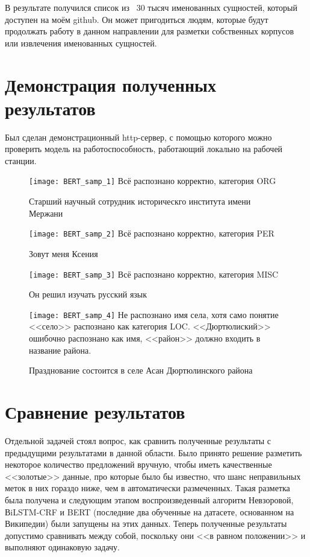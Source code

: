 В результате получился список из ~30 тысяч именованных сущностей, который доступен на моём github. %
Он может пригодиться людям, которые будут продолжать работу в данном направлении для разметки собственных корпусов или извлечения именованных сущностей. 

\section{Демонстрация полученных результатов}

Был сделан демонстрационный http-сервер, с помощью которого можно проверить модель на работоспособность, работающий локально на рабочей станции.


\begin{figure}[H]
\caption{Старший научный сотрудник историческго института имени Мержани}
\texttt{[image: BERT\_samp\_1]}
Всё распознано корректно, категория ORG
\label{fig:BERT_samp_1}
\end{figure}
\begin{figure}[H]
\caption{Зовут меня Ксения}
\texttt{[image: BERT\_samp\_2]}
Всё распознано корректно, категория PER
\label{fig:BERT_samp_2}
\end{figure}
\begin{figure}[H]
\caption{Он решил изучать русский язык}
\texttt{[image: BERT\_samp\_3]}
Всё распознано корректно, категория MISC
\label{fig:BERT_samp_3}
\end{figure}
\begin{figure}[H]
\caption{Празднование состоится в селе Асан Дюртюлинского района}
\texttt{[image: BERT\_samp\_4]}
Не распознано имя села, хотя само понятие <<село>> распознано как категория LOC. <<Дюртюлиский>> ошибочно распознано как имя, <<район>> должно входить в название района.
\label{fig:BERT_samp_4}
\end{figure}



\section{Сравнение результатов}

Отдельной задачей стоял вопрос, как сравнить полученные результаты с предыдущими результатами в данной области. Было принято решение разметить некоторое количество предложений вручную, чтобы иметь качественные <<золотые>> данные, про которые было бы известно, что шанс неправильных меток в них гораздо ниже, чем в автоматически размеченных. Такая разметка была получена и следующим этапом воспроизведенный алгоритм Невзоровой, ВiLSTM-CRF и BERT (последние два обученные на датасете, основанном на Википедии) были запущены на этих данных. Теперь полученные результаты допустимо сравнивать между собой, поскольку они <<в равном положении>> и выполняют одинаковую задачу.

